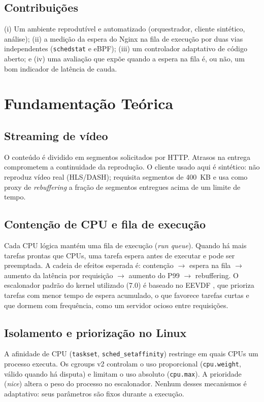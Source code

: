 \documentclass[12pt,a4paper]{article}
\begin{document}
\subsection{Contribuições}
(i) Um ambiente reprodutível e automatizado (orquestrador, cliente sintético, análise); (ii) a medição da
espera do Nginx na fila de execução por duas vias independentes (\texttt{schedstat} e eBPF); (iii) um
controlador adaptativo de código aberto; e (iv) uma avaliação que expõe quando a espera na fila é, ou não, um
bom indicador de latência de cauda.

\section{Fundamentação Teórica}

\subsection{Streaming de vídeo}
O conteúdo é dividido em segmentos solicitados por HTTP. Atrasos na entrega comprometem a continuidade da
reprodução. O cliente usado aqui é sintético: não reproduz vídeo real (HLS/DASH); requisita segmentos de
400~KB e usa como proxy de \textit{rebuffering} a fração de segmentos entregues acima de um limite de tempo.

\subsection{Contenção de CPU e fila de execução}
Cada CPU lógica mantém uma fila de execução (\textit{run queue}). Quando há mais tarefas prontas que CPUs, uma
tarefa espera antes de executar e pode ser preemptada. A cadeia de efeitos esperada é: contenção $\rightarrow$
espera na fila $\rightarrow$ aumento da latência por requisição $\rightarrow$ aumento do P99 $\rightarrow$
rebuffering. O escalonador padrão do kernel utilizado (7.0) é baseado no EEVDF
\cite{stoica1995eevdf}, que prioriza tarefas com menor tempo de espera acumulado, o que favorece tarefas
curtas e que dormem com frequência, como um servidor ocioso entre requisições.

\subsection{Isolamento e priorização no Linux}
A afinidade de CPU (\texttt{taskset}, \texttt{sched\_setaffinity}) restringe em quais CPUs um processo executa.
Os cgroups v2 \cite{cgroupv2} controlam o uso proporcional (\texttt{cpu.weight}, válido quando há disputa) e
limitam o uso absoluto (\texttt{cpu.max}). A prioridade (\textit{nice}) altera o peso do processo no
escalonador. Nenhum desses mecanismos é adaptativo: seus parâmetros são fixos durante a execução.
\end{document}
